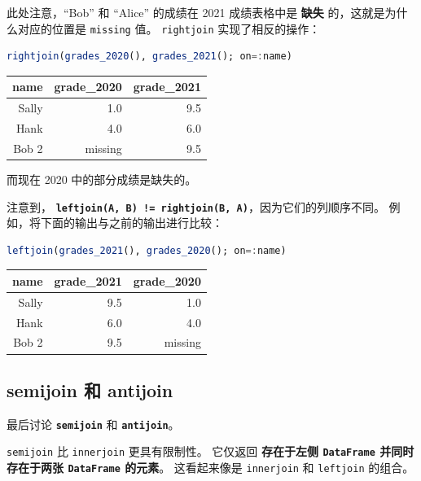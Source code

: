 \documentclass[
  notoc %
]{tufte-book}
\newcommand{\passthrough}[1]{#1}
\begin{document}
此处注意，``Bob'' 和 ``Alice'' 的成绩在 2021 成绩表格中是 \textbf{缺失}
的，这就是为什么对应的位置是 \passthrough{\lstinline!missing!} 值。
\passthrough{\lstinline!rightjoin!} 实现了相反的操作：

\begin{lstlisting}[language=Julia]
rightjoin(grades_2020(), grades_2021(); on=:name)
\end{lstlisting}

\begin{longtable}[]{@{}rrr@{}}
\toprule
name & grade\_2020 & grade\_2021 \\
\midrule
\endhead
Sally & 1.0 & 9.5 \\
Hank & 4.0 & 6.0 \\
Bob 2 & missing & 9.5 \\
\bottomrule
\end{longtable}

而现在 2020 中的部分成绩是缺失的。

注意到，
\textbf{\passthrough{\lstinline"leftjoin(A, B) != rightjoin(B, A)"}}，因为它们的列顺序不同。
例如，将下面的输出与之前的输出进行比较：

\begin{lstlisting}[language=Julia]
leftjoin(grades_2021(), grades_2020(); on=:name)
\end{lstlisting}

\begin{longtable}[]{@{}rrr@{}}
\toprule
name & grade\_2021 & grade\_2020 \\
\midrule
\endhead
Sally & 9.5 & 1.0 \\
Hank & 6.0 & 4.0 \\
Bob 2 & 9.5 & missing \\
\bottomrule
\end{longtable}

\hypertarget{sec:semijoin_antijoin}{%
\subsection{semijoin 和 antijoin}\label{sec:semijoin_antijoin}}

最后讨论 \textbf{\passthrough{\lstinline!semijoin!}} 和
\textbf{\passthrough{\lstinline!antijoin!}}。

\passthrough{\lstinline!semijoin!} 比
\passthrough{\lstinline!innerjoin!} 更具有限制性。 它仅返回
\textbf{存在于左侧 \passthrough{\lstinline!DataFrame!} 并同时存在于两张
\passthrough{\lstinline!DataFrame!} 的元素}。 这看起来像是
\passthrough{\lstinline!innerjoin!} 和
\passthrough{\lstinline!leftjoin!} 的组合。
\end{document}
